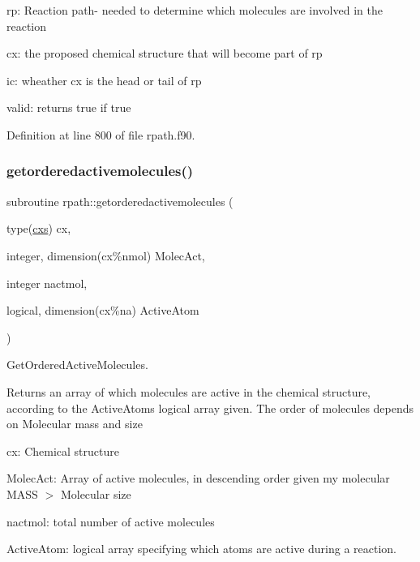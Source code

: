 \begin{DoxyItemize}
\item rp\+: Reaction path-\/ needed to determine which molecules are involved in the reaction
\item cx\+: the proposed chemical structure that will become part of rp
\item ic\+: wheather cx is the head or tail of rp
\item valid\+: returns true if true 
\end{DoxyItemize}

Definition at line 800 of file rpath.\+f90.

\mbox{\label{namespacerpath_a2e0e1a6e2688c61a90654578a1f3e039}} 
\subsubsection{\texorpdfstring{getorderedactivemolecules()}{getorderedactivemolecules()}}
{\footnotesize\ttfamily subroutine rpath\+::getorderedactivemolecules (\begin{DoxyParamCaption}\item[{type(\mbox{\hyperlink{structchemstr_1_1cxs}{cxs}})}]{cx,  }\item[{integer, dimension(cx\%nmol)}]{Molec\+Act,  }\item[{integer}]{nactmol,  }\item[{logical, dimension(cx\%na)}]{Active\+Atom }\end{DoxyParamCaption})}



Get\+Ordered\+Active\+Molecules. 

Returns an array of which molecules are active in the chemical structure, according to the Active\+Atoms logical array given. The order of molecules depends on Molecular mass and size


\begin{DoxyItemize}
\item cx\+: Chemical structure
\item Molec\+Act\+: Array of active molecules, in descending order given my molecular M\+A\+SS $>$ Molecular size
\item nactmol\+: total number of active molecules
\item Active\+Atom\+: logical array specifying which atoms are active during a reaction. 
\end{DoxyItemize}

